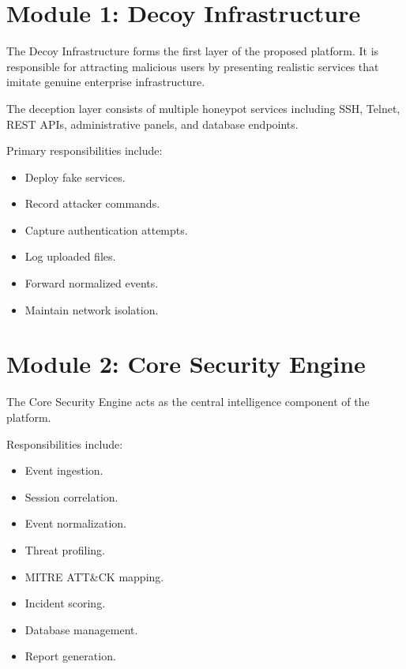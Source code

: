 \documentclass[12pt,a4paper]{report}
\begin{document}

\section{Module 1: Decoy Infrastructure}

The Decoy Infrastructure forms the first layer of the proposed platform. It is responsible for attracting malicious users by presenting realistic services that imitate genuine enterprise infrastructure.

The deception layer consists of multiple honeypot services including SSH, Telnet, REST APIs, administrative panels, and database endpoints.

Primary responsibilities include:

\begin{itemize}
\item Deploy fake services.
\item Record attacker commands.
\item Capture authentication attempts.
\item Log uploaded files.
\item Forward normalized events.
\item Maintain network isolation.
\end{itemize}


\section{Module 2: Core Security Engine}

The Core Security Engine acts as the central intelligence component of the platform.

Responsibilities include:

\begin{itemize}
\item Event ingestion.
\item Session correlation.
\item Event normalization.
\item Threat profiling.
\item MITRE ATT\&CK mapping.
\item Incident scoring.
\item Database management.
\item Report generation.
\end{itemize}
\end{document}
